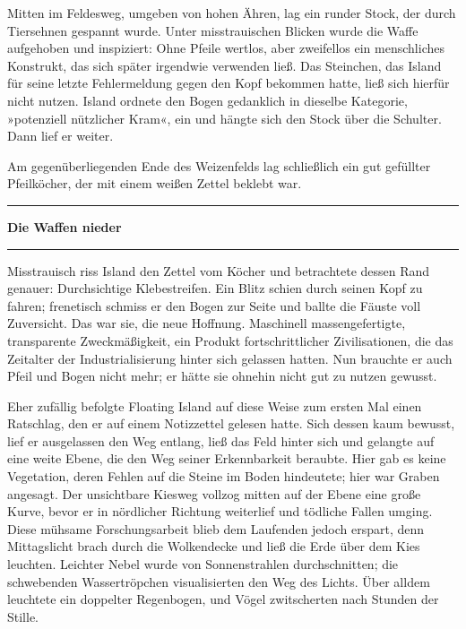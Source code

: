 Mitten im Feldesweg, umgeben von hohen Ähren, lag ein runder Stock, der durch Tiersehnen gespannt wurde. Unter misstrauischen Blicken wurde die Waffe aufgehoben und inspiziert: Ohne Pfeile wertlos, aber zweifellos ein menschliches Konstrukt, das sich später irgendwie verwenden ließ. Das Steinchen, das Island für seine letzte Fehlermeldung gegen den Kopf bekommen hatte, ließ sich hierfür nicht nutzen. Island ordnete den Bogen gedanklich in dieselbe Kategorie, »potenziell nützlicher Kram«, ein und hängte sich den Stock über die Schulter. Dann lief er weiter.

Am gegenüberliegenden Ende des Weizenfelds lag schließlich ein gut gefüllter Pfeilköcher, der mit einem weißen Zettel beklebt war.

\noindent \parbox{\textwidth}{ \vspace{3ex} \hrule \vspace{3ex}

\textbf{Die Waffen nieder}


\vspace{3ex} \hrule \vspace{3ex} }

Misstrauisch riss Island den Zettel vom Köcher und betrachtete dessen Rand genauer: Durchsichtige Klebestreifen. Ein Blitz schien durch seinen Kopf zu fahren; frenetisch schmiss er den Bogen zur Seite und ballte die Fäuste voll Zuversicht. Das war sie, die neue Hoffnung. Maschinell massengefertigte, transparente Zweckmäßigkeit, ein Produkt fortschrittlicher Zivilisationen, die das Zeitalter der Industrialisierung hinter sich gelassen hatten. Nun brauchte er auch Pfeil und Bogen nicht mehr; er hätte sie ohnehin nicht gut zu nutzen gewusst.

Eher zufällig befolgte Floating Island auf diese Weise zum ersten Mal einen Ratschlag, den er auf einem Notizzettel gelesen hatte. Sich dessen kaum bewusst, lief er ausgelassen den Weg entlang, ließ das Feld hinter sich und gelangte auf eine weite Ebene, die den Weg seiner Erkennbarkeit beraubte. Hier gab es keine Vegetation, deren Fehlen auf die Steine im Boden hindeutete; hier war Graben angesagt. Der unsichtbare Kiesweg vollzog mitten auf der Ebene eine große Kurve, bevor er in nördlicher Richtung weiterlief und tödliche Fallen umging. Diese mühsame Forschungsarbeit blieb dem Laufenden jedoch erspart, denn Mittagslicht brach durch die Wolkendecke und ließ die Erde über dem Kies leuchten. Leichter Nebel wurde von Sonnenstrahlen durchschnitten; die schwebenden Wassertröpchen visualisierten den Weg des Lichts. Über alldem leuchtete ein doppelter Regenbogen, und Vögel zwitscherten nach Stunden der Stille.

